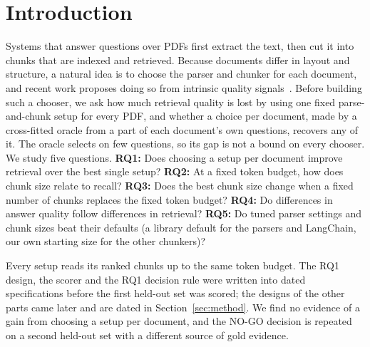 \section{Introduction}\label{sec:intro}

Systems that answer questions over PDFs first extract the text, then cut it
into chunks that are indexed and retrieved. Because documents differ in layout
and structure, a natural idea is to choose the parser and chunker for each
document, and recent work proposes doing so from intrinsic quality
signals~\cite{demourajunior2026adaptive}. Before building such a chooser, we ask
how much retrieval quality is lost by using one fixed parse-and-chunk setup for
every PDF, and whether a choice per document, made by a cross-fitted oracle from
a part of each document's own questions, recovers any of it. The oracle selects
on few questions, so its gap is not a bound on every chooser. We study five
questions. \textbf{RQ1:} Does choosing a setup per document improve retrieval over
the best single setup? \textbf{RQ2:} At a fixed token budget, how does chunk size
relate to recall? \textbf{RQ3:} Does the best chunk size change when a fixed number
of chunks replaces the fixed token budget? \textbf{RQ4:} Do differences in answer
quality follow differences in retrieval? \textbf{RQ5:} Do tuned parser settings and
chunk sizes beat their defaults (a library default for the parsers and
LangChain, our own starting size for the other chunkers)?

Every setup reads its ranked chunks up to the same token budget. The RQ1 design,
the scorer and the RQ1 decision rule were written into dated specifications
before the first held-out set was scored; the designs of the other parts came
later and are dated in Section~\ref{sec:method}. We find no evidence of a gain from
choosing a setup per document, and the NO-GO decision is repeated on a second
held-out set with a different source of gold evidence. 
